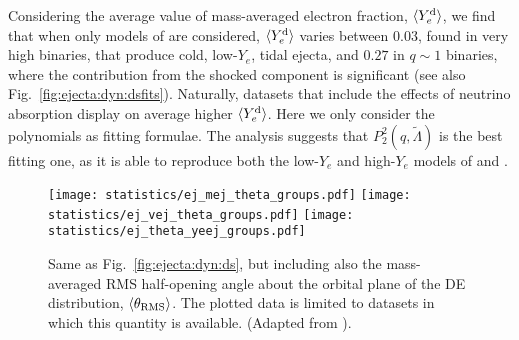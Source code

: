Considering the average value of mass-averaged electron fraction, $\langle Y^{\text{d}}_{e}\rangle$, we find 
that when only models of \DSrefset{} are considered, $\langle Y^{\text{d}}_{e}\rangle$ varies 
between $0.03$, found in very high \mr{} binaries, that produce cold, low-$Y_e$,
tidal ejecta, and $0.27$ in $q\sim1$  %
binaries, where the contribution from the shocked component is significant 
(see also Fig.~\ref{fig:ejecta:dyn:dsfits}). 
%
Naturally, datasets that include the effects of neutrino absorption display 
on average higher $\langle Y^{\text{d}}_{e}\rangle$. 
%
Here we only consider the polynomials as fitting formulae. 
The analysis suggests that $P_2^2(q,\tilde\Lambda)$ is the best fitting one, 
as it is able to reproduce both the low-$Y_e$ and high-$Y_e$ models of 
\DSheatcool{} and \DSrefset{}.

\begin{figure*}[t]
    \centering 
    \texttt{[image: statistics/ej\_mej\_theta\_groups.pdf]}
    \texttt{[image: statistics/ej\_vej\_theta\_groups.pdf]}
    \texttt{[image: statistics/ej\_theta\_yeej\_groups.pdf]}
    \caption{
        Same as Fig.~\ref{fig:ejecta:dyn:ds}, but including also the 
        mass-averaged \ac{RMS} half-opening angle about the orbital plane of the 
        \ac{DE} distribution, $\langle\theta_{\rm RMS}\rangle$. The plotted 
        data is limited to datasets in which this quantity is available. 
        (Adapted from \citet{Nedora:2020qtd}).
    }
    \label{fig:ejecta:dynej_thetarms}
\end{figure*}

